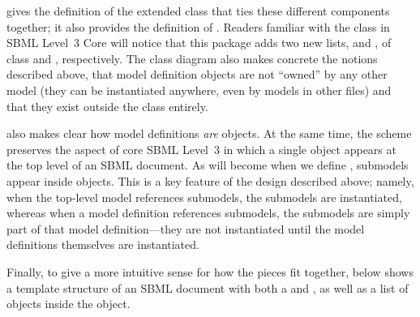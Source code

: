  gives the definition of the extended
\SBML class that ties these different components together; it also
provides the definition of \ExternalModelDefinition.  Readers familiar
with the \SBML class in SBML Level~3 Core will notice that this package
adds two new lists,  and
, of class \ListOfModelDefinitions
and \ListOfExternalModelDefinitions, respectively.  The class diagram
also makes concrete the notions described above, that model definition
objects are not ``owned'' by any other model (they can be instantiated
anywhere, even by models in other files) and that they exist outside the
\Model class entirely.

 also makes clear how model definitions
\emph{are} \Model objects.  At the same time, the scheme preserves the
aspect of core SBML Level~3 in which a single \Model object appears at
the top level of an SBML document.  As will become when we define
\Model, submodels appear inside \Model objects.  This is a key feature
of the design described above; namely, when the top-level model
references submodels, the submodels are instantiated, whereas when a
model definition references submodels, the submodels are simply part of
that model definition---they are not instantiated until the model
definitions themselves are instantiated.

Finally, to give a more intuitive sense for how the pieces fit together,
 below shows a template structure of an SBML document
with both a  and
, as well as a list of \Submodel
objects inside the \Model object.

\newcommand{\sayOptional}{\raisebox{0pt}[0pt][0pt]{\bigg\} \textrm{\emph{optional}}}}

